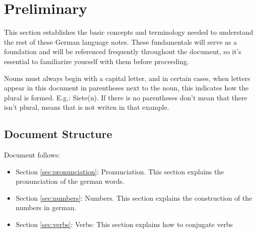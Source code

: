 \section{Preliminary}\label{sec:preliminary}

This section establishes the basic concepts and terminology needed to understand the rest of these German language notes. These fundamentals will serve as a foundation and will be referenced frequently throughout the document, so it's essential to familiarize yourself with them before proceeding.

Nouns must always begin with a capital letter, and in certain cases, when letters appear in this document in parentheses next to the noun, this indicates how the plural is formed. E.g.: Siete(n). If there is no parentheses don't mean that there isn't plural, means that is not writen in that example. 

\subsection{Document Structure}

Document follows:

\begin{itemize}
    \item Section \ref{sec:pronunciation}: Pronunciation. This section explains the pronunciation of the german words.
    \item Section \ref{sec:numbers}: Numbers. This section explains the construction of the numbers in german.
    \item Section \ref{sec:verbs}: Verbs: This section explains how to conjugate verbs
\end{itemize}